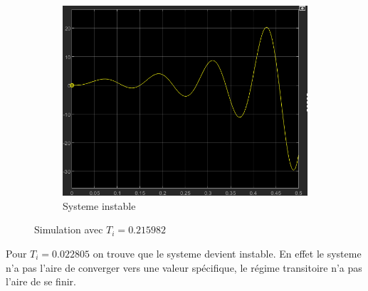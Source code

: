 \documentclass[12pt, a4paper]{report}
\begin{document}
\begin{figure}[H]
    \centering
    \begin{subfigure}[h]{0.6\linewidth}
        \includegraphics[width=\linewidth]{sim2ti4.png}
        \caption{Systeme instable}
    \end{subfigure}
    \caption{Simulation avec $T_i = 0.215982$}
    \label{fig:sim2KTi4}
\end{figure}

Pour $T_i = 0.022805$ on trouve que le systeme devient instable. En effet le systeme n'a pas l'aire de converger vers une valeur 
spécifique, le régime transitoire n'a pas l'aire de se finir. 
\end{document}
